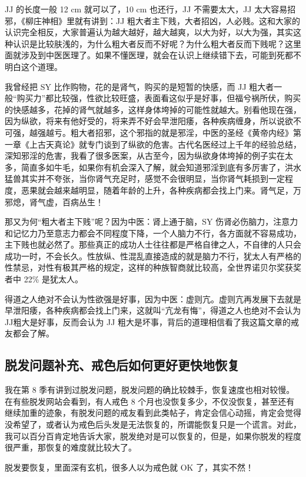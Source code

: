 \documentclass{ctexart}
\begin{document}
JJ 的长度一般 12 cm 就可以了，10 cm 也还行，JJ 不需要太大，JJ 太大容易招邪，《柳庄神相》里就有讲到：JJ 粗大者主下贱，大者招凶，人必贱。这和大家的认识完全相反，大家普遍认为越大越好，越大越爽，以大为好，以大为强，其实这种认识是比较肤浅的，为什么粗大者反而不好呢？为什么粗大者反而下贱呢？这里面就涉及到中医医理了。如果不懂医理，就会在认识上继续错下去，可能到死都不明白这个道理。

我曾经把 SY 比作购物，花的是肾气，购买的是短暂的快感，而 JJ 粗大者一般“购买力”都比较强，性欲比较旺盛，表面看这似乎是好事，但福兮祸所伏，购买的快感越多，花掉的肾气就越多，这样身体垮掉的可能性就越大。别看他现在强，因为纵欲，将来有他好受的，将来弄不好会早泄阳痿，各种疾病缠身，所以说欲不可强，越强越亏。粗大者招邪，这个邪指的就是邪淫，中医的圣经《黄帝内经》第一章《上古天真论》就专门谈到了纵欲的危害。古代名医经过上千年的经验总结，深知邪淫的危害，我看了很多医案，从古至今，因为纵欲身体垮掉的例子实在太多，简直多如牛毛，如果你有机会深入了解，就会知道邪淫到底有多厉害了，洪水猛兽其实并不夸张，当你肾气充足时，感觉不会很明显，当你肾气耗损到一定程度，恶果就会越来越明显，随着年龄的上升，各种疾病都会找上门来。肾气足，万邪熄，肾气虚，百病丛生！

那又为何“粗大者主下贱”呢？因为中医：肾上通于脑，SY 伤肾必伤脑力，注意力和记忆力乃至意志力都会不同程度下降，一个人脑力不行，各方面就不容易成功，主下贱也就必然了。那些真正的成功人士往往都是严格自律之人，不自律的人只会成功一时，不会长久。性放纵、性混乱直接造成的就是脑力不行，犹太人有严格的性禁忌，对性有极其严格的规定，这样的种族智商就比较高，全世界诺贝尔奖获奖者中 22\% 是犹太人。

得道之人绝对不会认为性欲强是好事，因为中医：虚则亢。虚则亢再发展下去就是早泄阳痿，各种疾病都会找上门来，这就叫“亢龙有悔”，得道之人也绝对不会认为JJ粗大是好事，反而会认为 JJ 粗大是坏事，背后的道理相信看了我这篇文章的戒友都会了解。

\subsection{脱发问题补充、戒色后如何更好更快地恢复}

我在第 8 季有讲到过脱发问题，脱发问题的确比较棘手，恢复速度也相对较慢。在有些脱发网站会看到，有人戒色 8 个月也没恢复多少，不仅没恢复，甚至还有继续加重的迹象，有脱发问题的戒友看到此类帖子，肯定会信心动摇，肯定会觉得没希望了，或者认为戒色后头发是无法恢复的，所谓能恢复只是一个谎言。对此，我可以百分百肯定地告诉大家，脱发绝对是可以恢复的，但是，如果你脱发的程度很严重，那恢复的难度就比较大了。

脱发要恢复，里面深有玄机，很多人以为戒色就 OK 了，其实不然！
\end{document}
